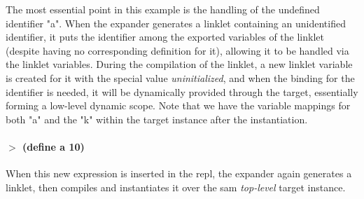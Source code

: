 The most essential point in this example is the handling of the
undefined identifier "a". When the expander generates a linklet
containing an unidentified identifier, it puts the identifier among
the exported variables of the linklet (despite having no corresponding
definition for it), allowing it to be handled via the linklet
variables. During the compilation of the linklet, a new linklet
variable is created for it with the special value
\emph{uninitialized}, and when the binding for the identifier is
needed, it will be dynamically provided through the target,
essentially forming a low-level dynamic scope. Note that we have the
variable mappings for both "a" and the "k" within the target instance
after the instantiation.

\paragraph{$>$ (define a 10)}

When this new expression is inserted in the repl, the expander again
generates a linklet, then compiles and instantiates it over the sam
\emph{top-level} target instance.

\vspace{-0.5cm}

